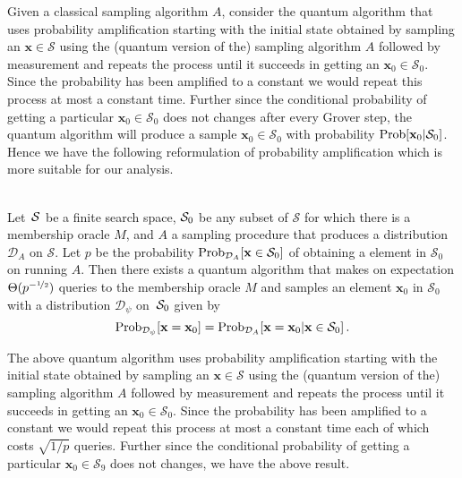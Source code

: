 Given a classical sampling algorithm $A$, consider the quantum algorithm that uses probability amplification starting with the initial state obtained by sampling an $\mathbf{x} \in \mathcal{S}$ using the (quantum version of the) sampling algorithm $A$ followed by measurement and repeats the process until it succeeds in getting an $\mathbf{x}_0 \in \mathcal{S}_0$. Since the probability has been amplified to a constant we would repeat this process at most a constant time. Further since the conditional probability of getting a particular $\mathbf{x}_0 \in \mathcal{S}_0$ does not changes after every Grover step, the quantum algorithm will produce a sample $\mathbf{x}_0\in\mathcal{S}_0$ with probability $\mathrm{Prob}[\mathbf{x}_0|\mathcal{S}_0]$.  Hence we have the following reformulation of probability amplification which is more suitable for our analysis.

\begin{theorem}~\\
\label{thm:probamp}
Let~$\mathcal{S}$ be a finite search space, $\mathcal{S}_0$ be any subset of $\mathcal{S}$ for which there is a membership oracle $M$, and $A$ a sampling procedure that produces a distribution $\mathcal{D}_A$ on $\mathcal{S}$. Let $p$ be the probability $\mathrm{Prob}_{\mathcal{D}_A}[\mathbf{x} \in\mathcal{S}_0]$ of obtaining a element in $\mathcal{S}_0$ on running $A$.  Then there exists a quantum algorithm that makes on expectation $\Theta(p^{-\nicefrac{1}{2}})$ queries to the membership oracle $M$ and samples an element $\mathbf{x}_0$ in $\mathcal{S}_0$ with a distribution $\mathcal{D}_\psi$ on~$\mathcal{S}_0$ given by
\[
  \mathrm{Prob}_{\mathcal{D}_\psi}[\mathbf{x}=\mathbf{x}_0]= \mathrm{Prob}_{\mathcal{D}_A}[\mathbf{x}=\mathbf{x}_0|\mathbf{x}\in\mathcal{S}_0]\,.
\]
\end{theorem}

The above quantum algorithm uses probability amplification starting with the initial state obtained by sampling an $\mathbf{x} \in \mathcal{S}$ using the (quantum version of the) sampling algorithm $A$ followed by measurement and repeats the process until it succeeds in getting an $\mathbf{x}_0 \in \mathcal{S}_0$. Since the probability has been amplified to a constant we would repeat this process at most a constant time each of which costs $\sqrt{1/p}$ queries. Further since the conditional probability of getting a particular $\mathbf{x}_0 \in \mathcal{S}_9$ does not changes, we have the above result.
